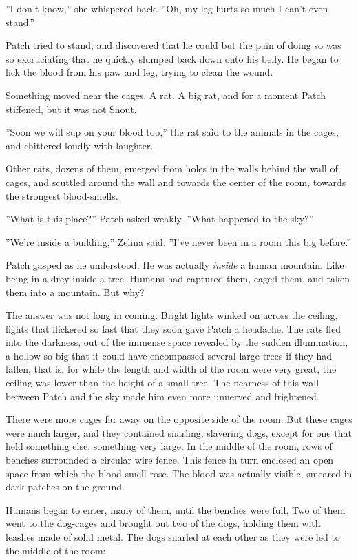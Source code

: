 \documentclass[12pt]{book}
\begin{document}
 ''I don't know,'' she whispered back. ''Oh, my leg hurts so much I can't even stand.''\par
 Patch tried to stand, and discovered that he could %
 but the pain of doing so was so excruciating that he quickly slumped back down onto his belly. He began to lick the blood from his paw and leg, trying to clean the wound.\par
 Something moved near the cages. A rat. A big rat, and for a moment Patch stiffened, but it was not Snout.\par
 ''Soon we will sup on your blood too,'' the rat said to the animals in the cages, and chittered loudly with laughter.\par
 Other rats, dozens of them, emerged from holes in the walls behind the wall of cages, and scuttled around the wall and towards the center of the room, towards the strongest blood-smells.\par
 ''What is this place?'' Patch asked weakly. ''What happened to the sky?''\par
 ''We're inside a building,'' Zelina said. ''I've never been in a room this big before.''\par
 Patch gasped as he understood. He was actually {\it inside} a human mountain. Like being in a drey inside a tree. Humans had captured them, caged them, and taken them into a mountain. But why?\par
 The answer was not long in coming. Bright lights winked on across the ceiling, lights that flickered so fast that they soon gave Patch a headache. The rats fled into the darkness, out of the immense space revealed by the sudden illumination, a hollow so big that it could have encompassed several large trees %
 if they had fallen, that is, for while the length and width of the room were very great, the ceiling was lower than the height of a small tree. The nearness of this wall between Patch and the sky made him even more unnerved and frightened.\par
 There were more cages far away on the opposite side of the room. But these cages were much larger, and they contained snarling, slavering dogs, except for one that held %
 something else, something very large. In the middle of the room, rows of benches surrounded a circular wire fence. This fence in turn enclosed an open space from which the blood-smell rose. The blood was actually visible, smeared in dark patches on the ground.\par
 Humans began to enter, many of them, until the benches were full. Two of them went to the dog-cages and brought out two of the dogs, holding them with leashes made of solid metal. The dogs snarled at each other as they were led to the middle of the room:\par
\end{document}
